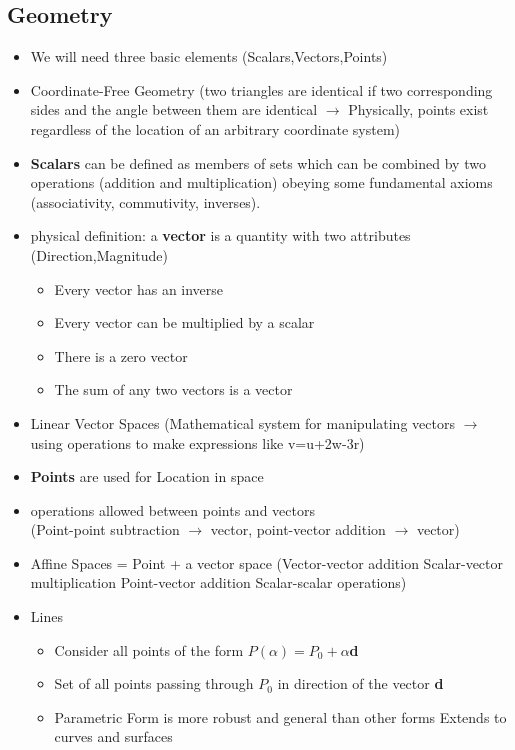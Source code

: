 \documentclass[11pt,a4paper]{article}
\begin{document}
	\subsection{Geometry}
		\begin{itemize}
			\item We will need three basic elements	(Scalars,Vectors,Points)
			\item Coordinate-Free Geometry (two triangles are identical if two corresponding sides and the angle between them are identical $\rightarrow$ Physically, points exist regardless of the location of an arbitrary coordinate system)
			\item \textbf{Scalars} can be defined as members of sets which can be combined by two operations (addition and multiplication) obeying some fundamental axioms (associativity, commutivity, inverses).
			\item physical definition: a \textbf{vector} is a quantity with two attributes (Direction,Magnitude)
				\begin{itemize}
					\item Every vector has an inverse	
					\item Every vector can be multiplied by a scalar	
					\item There is a zero vector	
					\item The sum of any two vectors is a vector
				\end{itemize}
			\item Linear Vector Spaces (Mathematical system for manipulating vectors $\rightarrow$ using operations to make expressions like v=u+2w-3r)
			\item \textbf{Points} are used for Location in space
			\item operations allowed between points and vectors\\ (Point-point subtraction $\rightarrow$ vector, point-vector addition $\rightarrow$ vector)
			\item Affine Spaces = Point + a vector space (Vector-vector addition Scalar-vector multiplication Point-vector addition Scalar-scalar operations)
			\item Lines
				\begin{itemize}
					\item Consider all points of the form $P(\alpha)=P_0 + \alpha$\textbf{d}
					\item Set of all points passing through $P_0$ in direction of the vector \textbf{d}
					\item Parametric Form is more robust and general than other forms Extends to curves and surfaces

\end{itemize}
\end{itemize}
\end{document}
